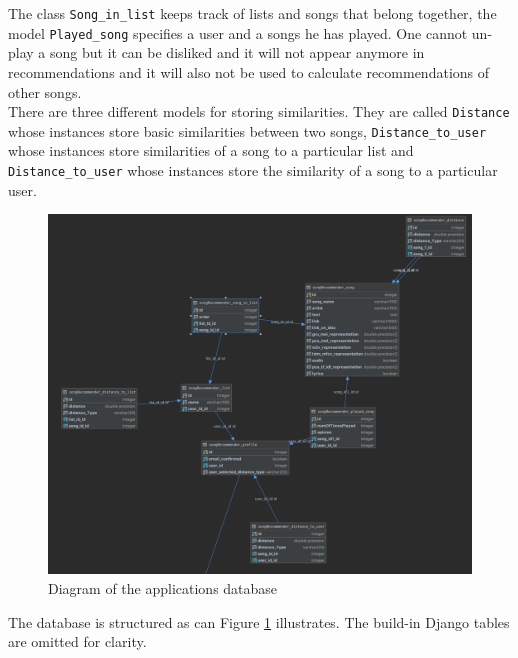 The class \texttt{Song\_in\_list} keeps track of lists and songs that belong together, the model \texttt{Played\_song} specifies a user and a songs he has played. One cannot un-play a song but it can be disliked and it will not appear anymore in recommendations and it will also not be used to calculate recommendations of other songs. \\
There are three different models for storing similarities. They are called \texttt{Distance} whose instances store basic similarities between two songs, \texttt{Distance\_to\_user} whose instances store similarities of a song to a particular list and \texttt{Distance\_to\_user} whose instances store the similarity of a song to a particular user. 
\begin{figure}[ht]
    \centering
	\includegraphics[width=120mm]{./img/postgres_database.png}
	\caption{Diagram of the applications database}
	\label{fig:diagram}
\end{figure}
The database is structured as can Figure \ref{fig:diagram} illustrates. The build-in Django tables are omitted for clarity.
